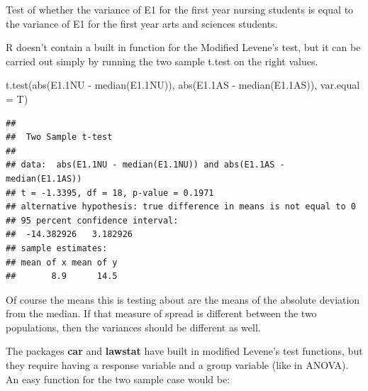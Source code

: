 \documentclass[
]{book}
\newenvironment{Shaded}{\begin{snugshade}}{\end{snugshade}}
\newcommand{\AttributeTok}[1]{\textcolor[rgb]{0.77,0.63,0.00}{#1}}
\newcommand{\ControlFlowTok}[1]{\textcolor[rgb]{0.13,0.29,0.53}{\textbf{#1}}}
\newcommand{\FloatTok}[1]{\textcolor[rgb]{0.00,0.00,0.81}{#1}}
\newcommand{\FunctionTok}[1]{\textcolor[rgb]{0.00,0.00,0.00}{#1}}
\newcommand{\NormalTok}[1]{#1}
\newcommand{\OtherTok}[1]{\textcolor[rgb]{0.56,0.35,0.01}{#1}}
\newcommand{\SpecialCharTok}[1]{\textcolor[rgb]{0.00,0.00,0.00}{#1}}
\newcommand{\StringTok}[1]{\textcolor[rgb]{0.31,0.60,0.02}{#1}}
\begin{document}
Test of whether the variance of E1 for the first year nursing students is equal to the variance of E1 for the first year arts and sciences students.

R doesn't contain a built in function for the Modified Levene's test, but it can be carried out simply by running the two sample t.test on the right values.

\begin{Shaded}
\begin{Highlighting}[]
\FunctionTok{t.test}\NormalTok{(}\FunctionTok{abs}\NormalTok{(E1}\FloatTok{.1}\NormalTok{NU }\SpecialCharTok{{-}} \FunctionTok{median}\NormalTok{(E1}\FloatTok{.1}\NormalTok{NU)), }\FunctionTok{abs}\NormalTok{(E1}\FloatTok{.1}\NormalTok{AS }\SpecialCharTok{{-}} \FunctionTok{median}\NormalTok{(E1}\FloatTok{.1}\NormalTok{AS)), }\AttributeTok{var.equal =}\NormalTok{ T)}
\end{Highlighting}
\end{Shaded}

\begin{verbatim}
## 
##  Two Sample t-test
## 
## data:  abs(E1.1NU - median(E1.1NU)) and abs(E1.1AS - median(E1.1AS))
## t = -1.3395, df = 18, p-value = 0.1971
## alternative hypothesis: true difference in means is not equal to 0
## 95 percent confidence interval:
##  -14.382926   3.182926
## sample estimates:
## mean of x mean of y 
##       8.9      14.5
\end{verbatim}

Of course the means this is testing about are the means of the absolute deviation from the median. If that measure of spread is different between the two populations, then the variances should be different as well.

The packages \textbf{car} and \textbf{lawstat} have built in modified Levene's test functions, but they require having a response variable and a group variable (like in ANOVA). An easy function for the two sample case would be:

\begin{Shaded}
\end{Shaded}
\end{document}
